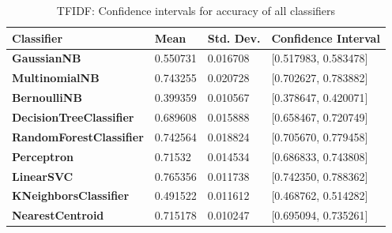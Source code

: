 \documentclass{article}
\begin{document}
\begin{table}[H]
\begin{tabular}{l|lll}
\textbf{Classifier}             & \textbf{Mean} & \textbf{Std. Dev.} & \textbf{Confidence Interval} \\ \hline
\textbf{GaussianNB}             & 0.550731      & 0.016708                    & {[}0.517983, 0.583478{]}     \\
\textbf{MultinomialNB}          & 0.743255      & 0.020728                    & {[}0.702627, 0.783882{]}     \\
\textbf{BernoulliNB}            & 0.399359      & 0.010567                    & {[}0.378647, 0.420071{]}     \\
\textbf{DecisionTreeClassifier} & 0.689608      & 0.015888                    & {[}0.658467, 0.720749{]}     \\
\textbf{RandomForestClassifier} & 0.742564      & 0.018824                    & {[}0.705670, 0.779458{]}     \\
\textbf{Perceptron}             & 0.71532       & 0.014534                    & {[}0.686833, 0.743808{]}     \\
\textbf{LinearSVC}              & 0.765356      & 0.011738                    & {[}0.742350, 0.788362{]}     \\
\textbf{KNeighborsClassifier}   & 0.491522      & 0.011612                    & {[}0.468762, 0.514282{]}     \\
\textbf{NearestCentroid}        & 0.715178      & 0.010247                    & {[}0.695094, 0.735261{]}    
\end{tabular}
\caption {TFIDF: Confidence intervals for accuracy of all classifiers}
\end{table}
\end{document}
